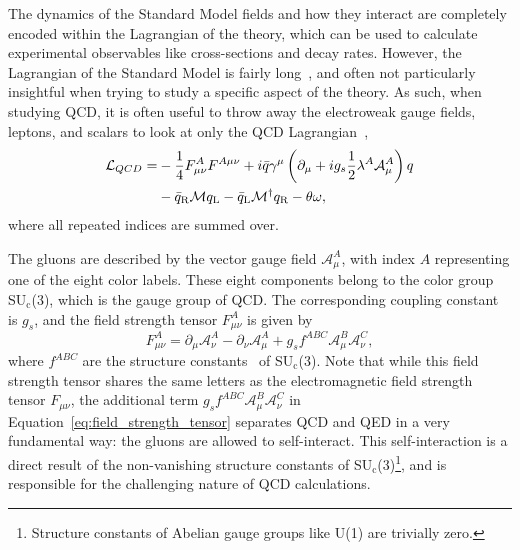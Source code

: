 The dynamics of the Standard Model fields and how they interact are completely encoded within the Lagrangian of the theory, which can be used to calculate experimental observables like cross-sections and decay rates. However, the Lagrangian of the Standard Model is fairly long~\cite{StandardModelLength1}, and often not particularly insightful when trying to study a specific aspect of the theory. As such, when studying QCD, it is often useful to throw away the electroweak gauge fields, leptons, and scalars to look at only the QCD Lagrangian~\cite{QCDHistory},
%
\begin{align*}
    \label{eq:qcd_lagrangian}
    \mathcal{L}_{Q C D}= & -\frac{1}{4} F_{\mu \nu}^A F^{A \space \mu \nu}+i \bar{q} \gamma^\mu\left(\partial_\mu+i g_s \frac{1}{2} \lambda^A \mathcal{A}_\mu^A\right) q \\
    & -\bar{q}_{\mathrm{R}} \mathcal{M} q_{\mathrm{L}}-\bar{q}_{\mathrm{L}} \mathcal{M}^{\dagger} q_{\mathrm{R}}-\theta \omega,
\end{align*}
%
where all repeated indices are summed over.

The gluons are described by the vector gauge field $\mathcal{A}_\mu^A$, with index $A$ representing one of the eight color labels. These eight components belong to the color group SU$_\text{c}$(3), which is the gauge group of QCD. The corresponding coupling constant is $g_{s}$, and the field strength tensor $F_{\mu \nu}^A$ is given by
%
\begin{equation}
    \label{eq:field_strength_tensor}
    F_{\mu \nu}^A = \partial_\mu \mathcal{A}_\nu^A - \partial_\nu \mathcal{A}_\mu^A + g_s f^{ABC} \mathcal{A}_\mu^B \mathcal{A}_\nu^C,
\end{equation}
%
where $f^{ABC}$ are the structure constants~\cite{StructureConstants} of SU$_\text{c}$(3). Note that while this field strength tensor shares the same letters as the electromagnetic field strength tensor $F_{\mu \nu}$, the additional term $g_s f^{ABC} \mathcal{A}_\mu^B \mathcal{A}_\nu^C$ in Equation~\ref{eq:field_strength_tensor} separates QCD and QED in a very fundamental way: the gluons are allowed to self-interact. This self-interaction is a direct result of the non-vanishing structure constants of SU$_\text{c}$(3)\footnote{Structure constants of Abelian gauge groups like U(1) are trivially zero.}, and is responsible for the challenging nature of QCD calculations.

